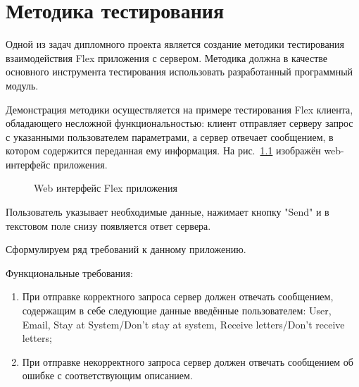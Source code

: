 \chapter{Методика тестирования}

Одной из задач дипломного проекта является создание методики тестирования взаимодействия Flex приложения
с сервером. Методика должна в качестве основного инструмента тестирования использовать разработанный программный модуль.

Демонстрация методики осуществляется на примере тестирования Flex клиента, обладающего
несложной функциональностью: клиент отправляет серверу запрос с указанными пользователем параметрами, а сервер отвечает
сообщением, в котором содержится переданная ему информация. На рис.~\ref{ris:flexClient.png} изображён web-интерфейс приложения.

\begin{figure}[ht]
\caption{Web интерфейс Flex приложения}
\label{ris:flexClient.png}
\end{figure}

Пользователь указывает необходимые данные, нажимает кнопку "Send" и в текстовом поле снизу появляется
ответ сервера.

Сформулируем ряд требований к данному приложению.

Функциональные требования:

\begin{enumerate}
\item При отправке корректного запроса сервер должен отвечать сообщением, содержащим в себе следующие
данные введённые пользователем: User, Email, Stay at System/Don't stay at system, Receive letters/Don't
receive letters;
\item При отправке некорректного запроса сервер должен отвечать сообщением об ошибке с соответствующим
описанием.
\end{enumerate}


